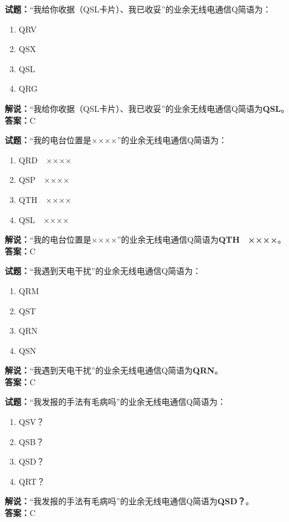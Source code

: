 \documentclass{ctexbook}
\begin{document}
\bigskip


\noindent\textbf{试题：}“我给你收据（QSL卡片）、我已收妥”的业余无线电通信Q简语为：
\begin{enumerate}[leftmargin=3em]
\item QRV
\item QSX
\item QSL
\item QRG
\end{enumerate}
\noindent\textbf{解说：}“我给你收据（QSL卡片）、我已收妥”的业余无线电通信Q简语为\textbf{QSL}。\\\noindent\textbf{答案：}C

\bigskip


\noindent\textbf{试题：}“我的电台位置是××××”的业余无线电通信Q简语为：
\begin{enumerate}[leftmargin=3em]
\item QRD　××××
\item QSP　××××
\item QTH　××××
\item QSL　××××
\end{enumerate}
\noindent\textbf{解说：}“我的电台位置是××××”的业余无线电通信Q简语为\textbf{QTH　××××}。\\\noindent\textbf{答案：}C


\bigskip


\noindent\textbf{试题：}“我遇到天电干扰”的业余无线电通信Q简语为：
\begin{enumerate}[leftmargin=3em]
\item QRM
\item QST
\item QRN
\item QSN
\end{enumerate}
\noindent\textbf{解说：}“我遇到天电干扰”的业余无线电通信Q简语为\textbf{QRN}。\\\noindent\textbf{答案：}C



\bigskip


\noindent\textbf{试题：}“我发报的手法有毛病吗”的业余无线电通信Q简语为：
\begin{enumerate}[leftmargin=3em]
\item QSV？
\item QSB？
\item QSD？
\item QRT？
\end{enumerate}
\noindent\textbf{解说：}“我发报的手法有毛病吗”的业余无线电通信Q简语为\textbf{QSD？}。\\\noindent\textbf{答案：}C
\end{document}
